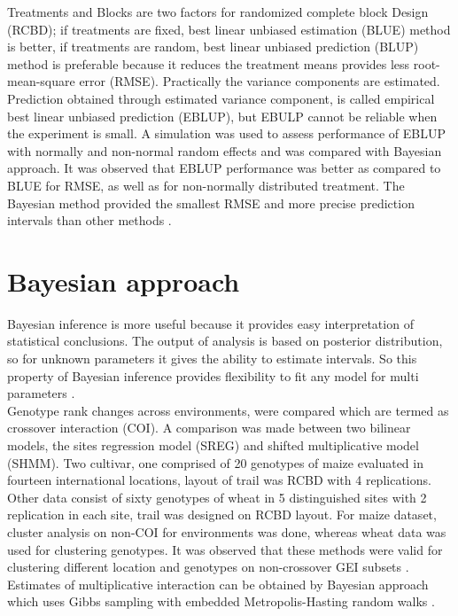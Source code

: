  Treatments and Blocks are two factors for randomized complete block Design (RCBD); if treatments are fixed, best linear unbiased estimation (BLUE) method is better, if treatments are random, best linear unbiased prediction (BLUP) method is preferable because it reduces the treatment means provides less root-mean-square error (RMSE). Practically the variance components are estimated. Prediction obtained through estimated variance component, is called empirical best linear unbiased prediction (EBLUP), but EBULP cannot be reliable when the experiment is small. A simulation was used to assess performance of EBLUP with normally and non-normal random effects and was compared with Bayesian approach. It was observed that EBLUP performance was better as compared to BLUE for RMSE, as well as for non-normally distributed treatment. The Bayesian method provided the smallest RMSE and more precise prediction intervals than other methods \citep{Forkman2013}.\\
 
\section{Bayesian approach}
Bayesian inference is more useful because it provides easy interpretation of statistical conclusions. The output of analysis is based on posterior distribution, so for unknown parameters it gives the ability to estimate intervals. So this property of Bayesian inference provides flexibility to fit any model for multi parameters \citep{Gelman2004}.\\

 Genotype rank changes across environments, were compared which are termed as crossover interaction (COI). A comparison was made between two bilinear models, the sites regression model (SREG) and shifted multiplicative model (SHMM). Two cultivar, one comprised of 20 genotypes of maize evaluated in fourteen international locations, layout of trail was RCBD with 4 replications. Other data consist of sixty genotypes of wheat in 5 distinguished sites with 2 replication in each site, trail was designed on RCBD layout. For maize dataset, cluster analysis on non-COI for environments was done, whereas wheat data was used for clustering genotypes.  It was observed that these methods were valid for clustering different location and genotypes on non-crossover GEI subsets \citep{Crossa2004}. \\
  
  Estimates of multiplicative interaction can be obtained by Bayesian approach which uses Gibbs sampling with embedded Metropolis-Hasting random walks \citep{Viele2000}.\\
 
